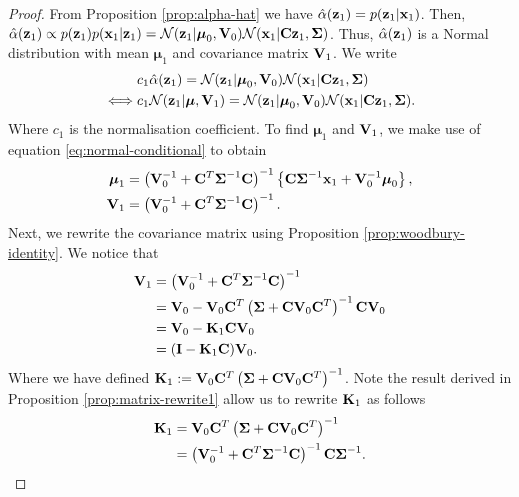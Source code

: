 \documentclass[11pt]{article}
\numberwithin{equation}{section}
\newcommand{\x}{{\bf x}}
\newcommand{\z}{{\bf z}}
\newcommand{\N}{\mathcal{N}}
\begin{document}
\begin{proof}
	From Proposition \ref{prop:alpha-hat} we have $\hat\alpha(\z_1) = p(\z_1\vert\x_1)$. Then, $\hat\alpha(\z_1) \propto p(\z_1)p(\x_1\vert\z_1) = \N(\z_1 \vert \boldsymbol\mu_0, {\bf V}_0) \N(\x_1\vert {\bf C}\z_1, \boldsymbol\Sigma)$. Thus, $\hat\alpha(\z_1)$ is a Normal distribution with mean $\boldsymbol{\mu}_1$ and covariance matrix ${\bf V}_1$. We write
	\begin{align}
		&c_1 \hat\alpha(\z_1) = \N(\z_1 \vert \boldsymbol\mu_0, {\bf V}_0) \N(\x_1\vert {\bf C}\z_1, \boldsymbol\Sigma)\\
		\iff& c_1 \N(\z_1\vert \boldsymbol\mu, {\bf V}_1) = \N(\z_1 \vert \boldsymbol\mu_0, {\bf V}_0) \N(\x_1\vert {\bf C}\z_1, \boldsymbol\Sigma).
	\end{align}
	Where $c_1$ is the normalisation coefficient. To find $\boldsymbol{\mu}_1$ and ${\bf V}_1$, we make use of equation \eqref{eq:normal-conditional} to obtain
	\begin{align}
		\boldsymbol{\mu}_1 &= \left({\bf V}_0^{-1} + {\bf C}^T\boldsymbol{\Sigma}^{-1} {\bf C}\right)^{-1} \left\{{\bf C}\boldsymbol\Sigma^{-1}\x_1 + {\bf V}_0^{-1}\boldsymbol\mu_0\right\},\\
		{\bf V}_1 &= \left({\bf V}_0^{-1} + {\bf C}^T\boldsymbol{\Sigma}^{-1} {\bf C}\right)^{-1}.
	\end{align}
	Next, we rewrite the covariance matrix using Proposition \ref{prop:woodbury-identity}. We notice that 
	\begin{align}
		{\bf V}_1 &= \left({\bf V}_0^{-1} + {\bf C}^T\boldsymbol{\Sigma}^{-1} {\bf C}\right)^{-1}\\
		&= {\bf V}_0 - {\bf V}_0 {\bf C}^T\left(\boldsymbol\Sigma + {\bf C}{\bf V}_0{\bf C}^T\right)^{-1}{\bf C}{\bf V}_0 \\
		&= {\bf V}_0 - {\bf K}_1{\bf C}{\bf V}_0\\
		&= ({\bf I} - {\bf K}_1{\bf C}){\bf V}_0. \label{eq:part-v1-rewrite}
	\end{align}
	Where we have defined ${\bf K}_1 := {\bf V}_0 {\bf C}^T\left(\boldsymbol\Sigma + {\bf C}{\bf V}_0{\bf C}^T\right)^{-1}$. Note the result derived in Proposition \ref{prop:matrix-rewrite1} allow us to rewrite ${\bf K}_1$ as follows
	\begin{align}
		{\bf K}_1 &= {\bf V}_0 {\bf C}^T\left(\boldsymbol\Sigma + {\bf C}{\bf V}_0{\bf C}^T\right)^{-1}\\
				  &= \left({\bf V}_0^{-1} + {\bf C}^T \boldsymbol\Sigma^{-1}{\bf C}\right)^{-1}{\bf C}\boldsymbol{\Sigma}^{-1}. \label{eq:part-k1-rewrite}

\end{align}
\end{proof}
\end{document}
